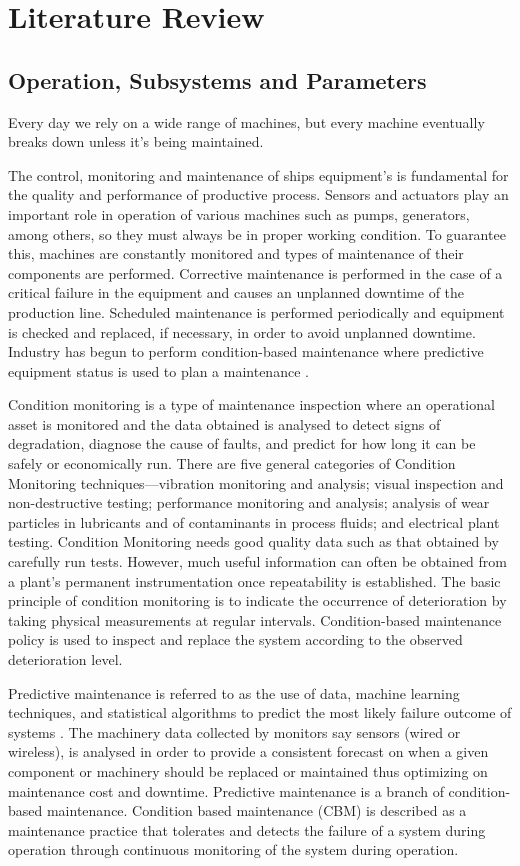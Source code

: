 \section{Literature Review}
\subsection{Operation, Subsystems and Parameters}
Every day we rely on a wide range of machines, but every machine eventually breaks down unless it’s being maintained.  

The control, monitoring and maintenance of ships equipment's is fundamental for the quality and performance of productive process. Sensors and actuators play an important role in operation of various machines such as pumps, generators, among others, so they must always be in proper working condition. To guarantee this, machines are constantly monitored and types of maintenance of their components are performed. Corrective maintenance is performed in the case of a critical failure in the equipment and causes an unplanned downtime of the production line. Scheduled maintenance is performed periodically and equipment is checked and replaced, if necessary, in order to avoid unplanned downtime. Industry has begun to perform condition-based maintenance where predictive equipment status is used to plan a maintenance \cite{noauthor_predictive_nodate}.

Condition monitoring is a type of maintenance inspection where an operational asset is monitored and the data obtained is analysed to detect signs of degradation, diagnose the cause of faults, and predict for how long it can be safely or economically run. There are five general categories of Condition Monitoring techniques—vibration monitoring and analysis; visual inspection and non-destructive testing; performance monitoring and analysis; analysis of wear particles in lubricants and of contaminants in process fluids; and electrical plant testing. Condition Monitoring needs good quality data such as that obtained by carefully run tests. However, much useful information can often be obtained from a plant’s permanent instrumentation once repeatability is established\cite{lu_condition_2018}. The basic principle of condition monitoring is to indicate the occurrence of deterioration by taking physical measurements at regular intervals. Condition-based maintenance policy is used to inspect and replace the system according to the observed deterioration level. 

Predictive maintenance is referred to as the use of data, machine learning techniques, and statistical algorithms to predict the most likely failure outcome of systems \cite{tinga_predictive_2017}. The machinery data collected by monitors say sensors (wired or wireless), is analysed in order to provide a consistent forecast on when a given component or machinery should be replaced or maintained thus optimizing on maintenance cost and downtime. Predictive maintenance is a branch of condition-based maintenance. Condition based maintenance (CBM) is described as a maintenance practice that tolerates and detects the failure of a system during operation through continuous monitoring of the system during operation\cite{kimera_predictive_2020}. 

